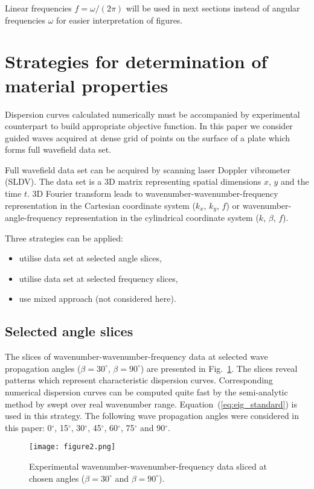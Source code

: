 \documentclass[preprint,12pt]{elsarticle}
\begin{document}
Linear frequencies $f=\omega/(2 \pi)$ will be used in next sections instead of angular frequencies $\omega$ for easier interpretation of figures.
\section{Strategies for determination of material properties \label{sec:strategies}}
Dispersion curves calculated numerically must be accompanied by experimental counterpart to build appropriate objective function. 
In this paper we consider guided waves acquired at dense grid of points on the surface of a plate which forms full wavefield data set. 

Full wavefield data set can be acquired by scanning laser Doppler vibrometer (SLDV).
The data set is a 3D matrix representing spatial dimensions $x$, $y$ and the time $t$. 
3D Fourier transform leads to wavenumber-wavenumber-frequency representation  in the Cartesian coordinate system ($k_x$, $k_y$, $f$) or wavenumber-angle-frequency representation  in the cylindrical coordinate system ($k$, $\beta$, $f$).

Three strategies can be applied:
\begin{itemize}
	\item utilise data set at selected angle slices,
	\item utilise data set at selected frequency slices,
	\item use mixed approach (not considered here).
\end{itemize}
\subsection{Selected angle slices}
The slices of wavenumber-wavenumber-frequency data at selected wave propagation angles ($\beta=30^{\circ}$, $\beta=90^{\circ}$) are presented in Fig.~\ref{fig:angle_slice}. 
The slices reveal patterns which represent characteristic dispersion curves. 
Corresponding numerical dispersion curves can be computed quite fast by the semi-analytic method by swept over real wavenumber range.
Equation~(\ref{eq:eig_standard}) is used in this strategy.
The following wave propagation angles were considered in this paper: 0$^{\circ}$, 15$^{\circ}$, 30$^{\circ}$, 45$^{\circ}$, 60$^{\circ}$, 75$^{\circ}$ and 90$^{\circ}$.
\begin{figure} [h!]
	\centering
	\texttt{[image: figure2.png]}	
	\caption{Experimental wavenumber-wavenumber-frequency data sliced at chosen angles ($\beta=30^{\circ}$ and $\beta=90^{\circ}$).}
	\label{fig:angle_slice}
\end{figure}
\end{document}
